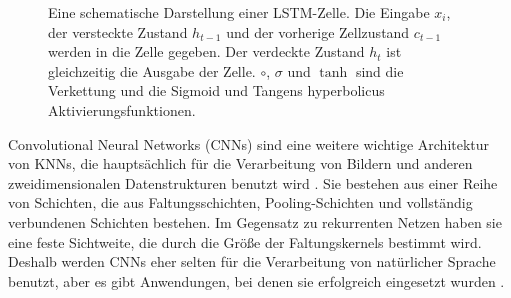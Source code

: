 \begin{figure}
\centering
\newcommand*{\connectorH}[4][]{
  \draw[#1] (#3) -| ($(#3) !#2! (#4)$) |- (#4);
}
\newcommand*{\connectorV}[4][]{
  \draw[#1] (#3) |- ($(#3) !#2! (#4)$) -| (#4);
}
\caption{Eine schematische Darstellung einer LSTM-Zelle. Die Eingabe $x_i$, der versteckte Zustand $h_{t-1}$ und der vorherige Zellzustand $c_{t-1}$ werden in die Zelle gegeben. Der verdeckte Zustand $h_t$ ist gleichzeitig die Ausgabe der Zelle. $\circ$, $\sigma$ und $\tanh$ sind die Verkettung und die Sigmoid und Tangens hyperbolicus Aktivierungsfunktionen.}
\label{fig:lstm}
\end{figure}

\foreignlanguage{english}{Convolutional Neural Networks} (CNNs) sind eine weitere wichtige Architektur von KNNs, die hauptsächlich für die Verarbeitung von Bildern und anderen zweidimensionalen Datenstrukturen benutzt wird \cite{neocognitron}.
Sie bestehen aus einer Reihe von Schichten, die aus Faltungsschichten, Pooling-Schichten und vollständig verbundenen Schichten bestehen.
Im Gegensatz zu rekurrenten Netzen haben sie eine feste Sichtweite, die durch die Größe der Faltungskernels bestimmt wird.
Deshalb werden CNNs eher selten für die Verarbeitung von natürlicher Sprache benutzt, aber es gibt Anwendungen, bei denen sie erfolgreich eingesetzt wurden \cite{tdnn}.


